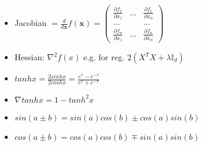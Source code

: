 \begin{itemize}
    \item Jacobian $= \frac{d}{d\boldsymbol{x}}f(\boldsymbol{x}) = \begin{pmatrix}
        \frac{\partial f_1}{\partial x_1} & ... & \frac{\partial f_1}{\partial x_n}\\
        \dots & & \dots\\
        \frac{\partial f_n}{\partial x_1} & ... & \frac{\partial f_n}{\partial x_n}
    \end{pmatrix}$
    \item Hessian: $\nabla^2 f(x)$ e.g. for reg. $2(X^TX + \lambda \mathbb{I}_d)$
    \item $tanhx = \frac{2sinhx}{2coshx} = \frac{e^x - e^{-x}}{e^x + e^{-x}}$
    \item $\nabla tanhx = 1 - tanh^2x$
    \item $sin(a\pm b) = sin(a)cos(b) \pm cos(a)sin(b)$
    \item $cos(a\pm b) = cos(a)cos(b) \mp sin(a)sin(b)$
\end{itemize}